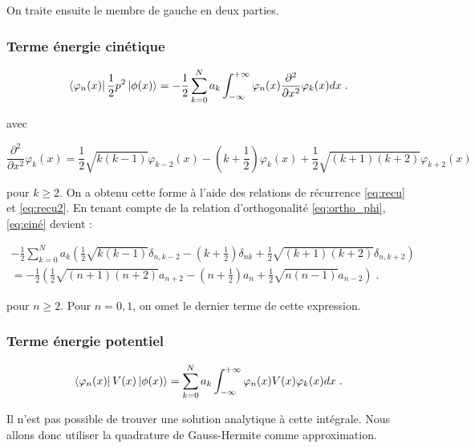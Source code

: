 \documentclass{report}
\begin{document}

On traite ensuite le membre de gauche en deux parties.

\subsubsection{Terme énergie cinétique}

\begin{equation}\label{eq:ciné}
\bra{\varphi_n(x)} \frac{1}{2}p^{2} \ket{\phi(x)} = - \frac{1}{2}\sum_{k=0}^N a_k \int_{-\infty}^{+\infty} \varphi_n(x) \frac{\partial^2}{\partial x^{2}} \varphi_k(x) dx\;.
\end{equation}

avec 

\begin{equation}
 \frac{\partial^2}{\partial x^{2}} \varphi_k(x) = \frac{1}{2}\sqrt{k(k-1)}\varphi_{k-2}(x) -\left(k+\frac{1}{2}\right)\varphi_k(x) + \frac{1}{2} \sqrt{(k+1)(k+2)}\varphi_{k+2}(x)
\end{equation}

pour $k \geq 2$. On a obtenu cette forme à l'aide des relations de récurrence \eqref{eq:recu} et \eqref{eq:recu2}. En tenant compte de la relation d'orthogonalité \eqref{eq:ortho_phi}, \eqref{eq:ciné} devient :

\begin{eqnarray}
- \frac{1}{2}\sum_{k=0}^N a_k \left(\frac{1}{2}\sqrt{k(k-1)}\delta_{n,k-2} - \left(k+\frac{1}{2}\right)\delta_{nk}+ \frac{1}{2} \sqrt{(k+1)(k+2)}\delta_{n,k+2} \right) \\
= - \frac{1}{2}\left(\frac{1}{2}\sqrt{(n+1)(n+2)}a_{n+2}-\left(n+\frac{1}{2}\right)a_{n}+\frac{1}{2}\sqrt{n(n-1)}a_{n-2} \right)\;.
\end{eqnarray}

pour $n \geq 2$. Pour $n = 0,1$, on omet le dernier terme de cette expression.

\subsubsection{Terme énergie potentiel}

\begin{equation}
\bra{\varphi_n(x)} V(x)\ket{\phi(x)} = \sum_{k=0}^N a_k\int_{-\infty}^{+\infty} \varphi_n(x) V(x) \varphi_k(x) dx\;.
\end{equation}

Il n'est pas possible de trouver une solution analytique à cette intégrale. Nous allons donc utiliser la quadrature de Gauss-Hermite comme approximation.
\end{document}
